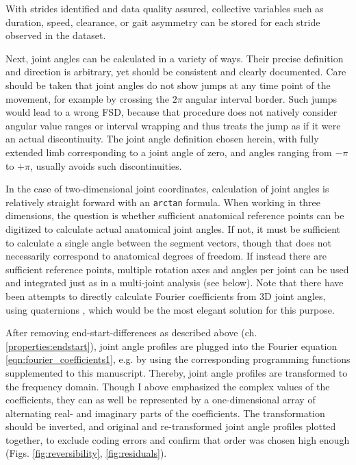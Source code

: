 With strides identified and data quality assured, collective variables such as duration, speed, clearance, or gait asymmetry can be stored for each stride observed in the dataset.


Next, joint angles can be calculated in a variety of ways.
Their precise definition and direction is arbitrary, yet should be consistent and clearly documented.
Care should be taken that joint angles do not show jumps at any time point of the movement, for example by crossing the \(2\pi\) angular interval border.
Such jumps would lead to a wrong FSD, because that procedure does not natively consider angular value ranges or interval wrapping and thus treats the jump as if it were an actual discontinuity.
The joint angle definition chosen herein, with fully extended limb corresponding to a joint angle of zero, and angles ranging from \(-\pi\) to \(+\pi\), usually avoids such discontinuities.

In the case of two-dimensional joint coordinates, calculation of joint angles is relatively straight forward with an \texttt{arctan} formula.
When working in three dimensions, the question is whether sufficient anatomical reference points can be digitized to calculate actual anatomical joint angles.
If not, it must be sufficient to calculate a single angle between the segment vectors, though that does not necessarily correspond to anatomical degrees of freedom.
If instead there are sufficient reference points, multiple rotation axes and angles per joint can be used and integrated just as in a multi-joint analysis (see below).
Note that there have been attempts to directly calculate Fourier coefficients from 3D joint angles, using quaternions \citep{Kenwright2015}, which would be the most elegant solution for this purpose.


After removing end-start-differences as described above (ch. \ref{properties:endstart}), joint angle profiles are plugged into the Fourier equation \eqref{eqn:fourier_coefficients1}, e.g. by using the corresponding programming functions supplemented to this manuscript.
Thereby, joint angle profiles are transformed to the frequency domain.
Though I above emphasized the complex values of the coefficients, they can as well be represented by a one-dimensional array of alternating real- and imaginary parts of the coefficients.
The transformation should be inverted, and original and re-transformed joint angle profiles plotted together, to exclude coding errors and confirm that order was chosen high enough (Figs. \ref{fig:reversibility}, \ref{fig:residuals}).

